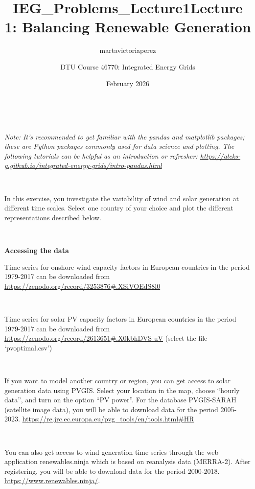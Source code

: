 \documentclass[10pt]{article}
\title{IEG_Problems_Lecture1}
\author{martavictoriaperez }
\date{February 2026}
\newenvironment{problem}[2][Problem]{\begin{trivlist}
\item[\hskip \labelsep {\bfseries #1}\hskip \labelsep {\bfseries #2.}]}{\end{trivlist}}
\begin{document}
 
\title{\textbf{Lecture 1: Balancing Renewable Generation}}
\author{
DTU Course 46770: Integrated Energy Grids }
\maketitle
 
\begin{problem}{1.1. Analysing solar and wind generation time series}

\

\textit{Note: It's recommended to get familiar with the pandas and matplotlib packages; these are Python packages commonly used for data science and plotting. The following tutorials 
 can be helpful as an introduction or refresher:  \url{https://aleks-g.github.io/integrated-energy-grids/intro-pandas.html}}

\

In this exercise, you investigate the variability of wind and solar generation at different time scales. Select one country of your choice and plot the different representations described below.

\

\textbf{Accessing the data}

Time series for onshore wind capacity factors in European countries in the period 1979-2017 can be downloaded from \url{https://zenodo.org/record/3253876#.XSiVOEdS8l0}

\

Time series for solar PV capacity factors in European countries in the period 1979-2017 can be downloaded from \url{https://zenodo.org/record/2613651#.X0kbhDVS-uV} (select the file ‘pvoptimal.csv’)

\

If you want to model another country or region, you can get access to solar generation data using PVGIS. Select your location in the map, choose “hourly data”, and turn on the option “PV power”. For the database PVGIS-SARAH (satellite image data), you will be able to download data for the period 2005-2023. \url{https://re.jrc.ec.europa.eu/pvg_tools/en/tools.html#HR}

\

You can also get access to wind generation time series through the web application renewables.ninja which is based on reanalysis data (MERRA-2). After registering, you will be able to download data for the period 2000-2018. \url{https://www.renewables.ninja/}.


\end{problem}
\end{document}
